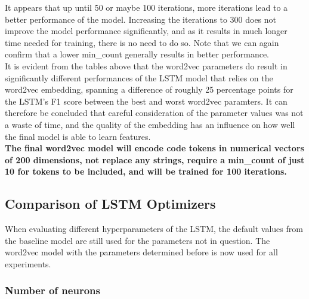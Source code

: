 \documentclass[
	a4paper,
	pagesize,
	pdftex,
	12pt,
	twoside, %
	BCOR=5mm, %
	ngerman,
	fleqn,
	final,
	]{scrartcl}
\begin{document}
It appears that up until 50 or maybe 100 iterations, more iterations lead to a better performance of the model. Increasing the iterations to 300 does not improve the model performance significantly, and as it results in much longer time needed for training, there is no need to do so. Note that we can again confirm that a lower min\_count generally results in better performance.\\
It is evident from the tables above that the word2vec parameters do result in significantly different performances of the LSTM model that relies on the word2vec embedding, spanning a difference of roughly 25 percentage points for the LSTM's F1 score between the best and worst word2vec paramters. It can therefore be concluded that careful consideration of the parameter values was not a waste of time, and the quality of the embedding has an influence on how well the final model is able to learn features.\\

\textbf{The final word2vec model will encode code tokens in numerical vectors of 200 dimensions, not replace any strings, require a min\_count of just 10 for tokens to be included, and will be trained for 100 iterations.}\\


\subsection{Comparison of LSTM Optimizers}

When evaluating different hyperparameters of the LSTM, the default values from the baseline model are still used for the parameters not in question. The word2vec model with the parameters determined before is now used for all experiments.

\subsubsection{Number of neurons}
\end{document}
